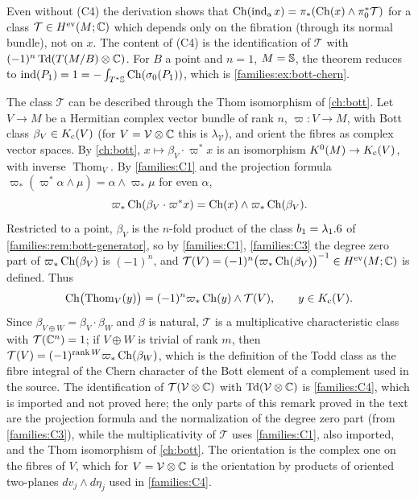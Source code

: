 \begin{remark}\label{families:rem:todd-structure}
  Even without (C4) the derivation shows that $\operatorname{Ch}(\operatorname{ind}_{\mathrm{a}} x)=\pi_*(\operatorname{Ch}(x)\wedge
  \pi_0^*\mathcal T)$ for a class $\mathcal T\in H^{\mathrm{ev}}(M;\mathbb{C})$ which depends only
  on the fibration (through its normal bundle), not on $x$. The content of (C4)
  is the identification of $\mathcal T$ with $(-1)^n\operatorname{Td}(T(M/B)\otimes\mathbb{C})$.
  For $B$ a point and $n=1$, $M=\mathbb{S}$, the theorem reduces to
  $\operatorname{ind}(P_1)=1=-\int_{T^*\mathbb{S}}\operatorname{Ch}(\sigma_0(P_1))$, which is
  \cref{families:ex:bott-chern}.
\end{remark}

\begin{remark}\label{families:rem:todd-thom}
  The class $\mathcal T$ can be described through the Thom isomorphism of \cref{ch:bott}.
  Let $V\to M$ be a Hermitian complex vector bundle of rank $n$, $\varpi\colon V\to M$, with
  Bott class $\beta_V\in K_{\mathrm{c}}(V)$ (for $V=\mathcal V\otimes\mathbb{C}$ this is $\lambda_{\mathcal V}$), and orient
  the fibres as complex vector spaces. By \cref{ch:bott}, $x\mapsto\beta_V\cdot\varpi^*x$ is an
  isomorphism $K^0(M)\to K_{\mathrm{c}}(V)$, with inverse $\operatorname{Thom}_V$. By \ref{families:C1}
  and the projection formula $\varpi_*(\varpi^*\alpha\wedge\mu)=\alpha\wedge\varpi_*\mu$ for even $\alpha$,
  \begin{equation*}
    \varpi_*\operatorname{Ch}(\beta_V\cdot\varpi^*x)=\operatorname{Ch}(x)\wedge\varpi_*\operatorname{Ch}(\beta_V).
  \end{equation*}
  Restricted to a point, $\beta_V$ is the $n$-fold product of the class $b_1=\lambda_1.6$ of
  \cref{families:rem:bott-generator}, so by \ref{families:C1}, \ref{families:C3} the degree zero part of
  $\varpi_*\operatorname{Ch}(\beta_V)$ is $(-1)^n$, and
  $\mathcal T(V)=(-1)^n\bigl(\varpi_*\operatorname{Ch}(\beta_V)\bigr)^{-1}\in H^{\mathrm{ev}}(M;\mathbb{C})$ is defined. Thus
  \begin{equation*}
    \operatorname{Ch}\bigl(\operatorname{Thom}_V(y)\bigr)=(-1)^n\varpi_*\operatorname{Ch}(y)\wedge\mathcal T(V),\qquad y\in K_{\mathrm{c}}(V).
  \end{equation*}
  Since $\beta_{V\oplus W}=\beta_V\cdot\beta_W$ and $\beta$ is natural, $\mathcal T$ is a multiplicative
  characteristic class with $\mathcal T(\mathbb{C}^n)=1$; if $V\oplus W$ is trivial of rank $m$, then
  $\mathcal T(V)=(-1)^{\operatorname{rank}W}\varpi_*\operatorname{Ch}(\beta_W)$, which is the definition of the Todd class
  as the fibre integral of the Chern character of the Bott element of a complement used in
  the source. The identification of $\mathcal T(\mathcal V\otimes\mathbb{C})$ with
  $\operatorname{Td}(\mathcal V\otimes\mathbb{C})$ is \ref{families:C4}, which is imported and not
  proved here; the only parts of this remark proved in the text are the
  projection formula and the normalization of the degree zero part (from
  \ref{families:C3}), while the multiplicativity of $\mathcal T$ uses
  \ref{families:C1}, also imported, and the Thom isomorphism of
  \cref{ch:bott}. The orientation is the complex one on the fibres of $V$,
  which for $V=\mathcal V\otimes\mathbb{C}$ is the orientation by products of oriented
  two-planes $dv_j\wedge d\eta_j$ used in \ref{families:C4}.
\end{remark}

